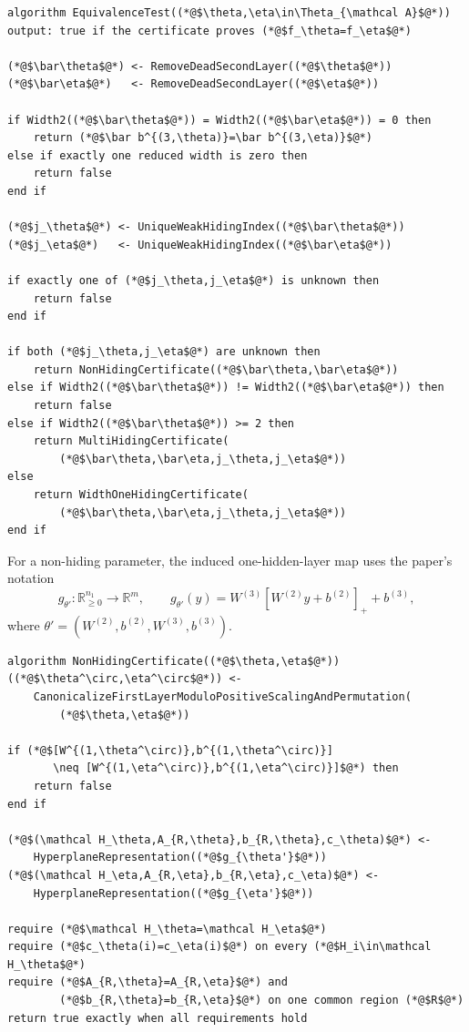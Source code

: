 \documentclass[11pt]{article}
\newcommand{\R}{\mathbb{R}}
\begin{document}
\begin{lstlisting}[caption={Exact equivalence dispatcher}]
algorithm EquivalenceTest((*@$\theta,\eta\in\Theta_{\mathcal A}$@*))
output: true if the certificate proves (*@$f_\theta=f_\eta$@*)

(*@$\bar\theta$@*) <- RemoveDeadSecondLayer((*@$\theta$@*))
(*@$\bar\eta$@*)   <- RemoveDeadSecondLayer((*@$\eta$@*))

if Width2((*@$\bar\theta$@*)) = Width2((*@$\bar\eta$@*)) = 0 then
    return (*@$\bar b^{(3,\theta)}=\bar b^{(3,\eta)}$@*)
else if exactly one reduced width is zero then
    return false
end if

(*@$j_\theta$@*) <- UniqueWeakHidingIndex((*@$\bar\theta$@*))
(*@$j_\eta$@*)   <- UniqueWeakHidingIndex((*@$\bar\eta$@*))

if exactly one of (*@$j_\theta,j_\eta$@*) is unknown then
    return false
end if

if both (*@$j_\theta,j_\eta$@*) are unknown then
    return NonHidingCertificate((*@$\bar\theta,\bar\eta$@*))
else if Width2((*@$\bar\theta$@*)) != Width2((*@$\bar\eta$@*)) then
    return false
else if Width2((*@$\bar\theta$@*)) >= 2 then
    return MultiHidingCertificate(
        (*@$\bar\theta,\bar\eta,j_\theta,j_\eta$@*))
else
    return WidthOneHidingCertificate(
        (*@$\bar\theta,\bar\eta,j_\theta,j_\eta$@*))
end if
\end{lstlisting}

For a non-hiding parameter, the induced one-hidden-layer map uses the paper's
notation
\[
  g_{\theta'}:\R_{\geq 0}^{n_1}\to\R^m,
  \qquad
  g_{\theta'}(y)
  =
  W^{(3)}[W^{(2)}y+b^{(2)}]_+ + b^{(3)},
\]
where \(\theta'=(W^{(2)},b^{(2)},W^{(3)},b^{(3)})\).

\begin{lstlisting}[caption={Non-hiding certificate}]
algorithm NonHidingCertificate((*@$\theta,\eta$@*))
((*@$\theta^\circ,\eta^\circ$@*)) <-
    CanonicalizeFirstLayerModuloPositiveScalingAndPermutation(
        (*@$\theta,\eta$@*))

if (*@$[W^{(1,\theta^\circ)},b^{(1,\theta^\circ)}]
       \neq [W^{(1,\eta^\circ)},b^{(1,\eta^\circ)}]$@*) then
    return false
end if

(*@$(\mathcal H_\theta,A_{R,\theta},b_{R,\theta},c_\theta)$@*) <-
    HyperplaneRepresentation((*@$g_{\theta'}$@*))
(*@$(\mathcal H_\eta,A_{R,\eta},b_{R,\eta},c_\eta)$@*) <-
    HyperplaneRepresentation((*@$g_{\eta'}$@*))

require (*@$\mathcal H_\theta=\mathcal H_\eta$@*)
require (*@$c_\theta(i)=c_\eta(i)$@*) on every (*@$H_i\in\mathcal H_\theta$@*)
require (*@$A_{R,\theta}=A_{R,\eta}$@*) and
        (*@$b_{R,\theta}=b_{R,\eta}$@*) on one common region (*@$R$@*)
return true exactly when all requirements hold
\end{lstlisting}
\end{document}
